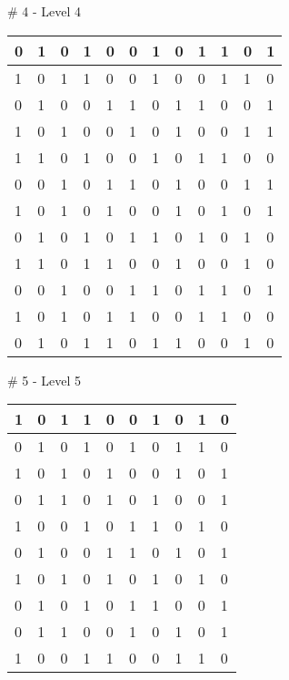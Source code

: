 \smallskip

\# 4 - Level 4 \newline
\begin{tabular}{|m{\collen}|m{\collen}|m{\collen}|m{\collen}|m{\collen}|m{\collen}|m{\collen}|m{\collen}|m{\collen}|m{\collen}|m{\collen}|m{\collen}|}
\hline
  0 & 1 & 0 & 1 & 0 & 0 & 1 & 0 & 1 & 1 & 0 & 1 \\
\hline
  1 & 0 & 1 & 1 & 0 & 0 & 1 & 0 & 0 & 1 & 1 & 0 \\
\hline
  0 & 1 & 0 & 0 & 1 & 1 & 0 & 1 & 1 & 0 & 0 & 1 \\
\hline
  1 & 0 & 1 & 0 & 0 & 1 & 0 & 1 & 0 & 0 & 1 & 1 \\
\hline
  1 & 1 & 0 & 1 & 0 & 0 & 1 & 0 & 1 & 1 & 0 & 0 \\
\hline
  0 & 0 & 1 & 0 & 1 & 1 & 0 & 1 & 0 & 0 & 1 & 1 \\
\hline
  1 & 0 & 1 & 0 & 1 & 0 & 0 & 1 & 0 & 1 & 0 & 1 \\
\hline
  0 & 1 & 0 & 1 & 0 & 1 & 1 & 0 & 1 & 0 & 1 & 0 \\
\hline
  1 & 1 & 0 & 1 & 1 & 0 & 0 & 1 & 0 & 0 & 1 & 0 \\
\hline
  0 & 0 & 1 & 0 & 0 & 1 & 1 & 0 & 1 & 1 & 0 & 1 \\
\hline
  1 & 0 & 1 & 0 & 1 & 1 & 0 & 0 & 1 & 1 & 0 & 0 \\
\hline
  0 & 1 & 0 & 1 & 1 & 0 & 1 & 1 & 0 & 0 & 1 & 0 \\
\hline
\end{tabular}


\smallskip

\# 5 - Level 5 \newline
\begin{tabular}{|m{\collen}|m{\collen}|m{\collen}|m{\collen}|m{\collen}|m{\collen}|m{\collen}|m{\collen}|m{\collen}|m{\collen}|}
\hline
  1 & 0 & 1 & 1 & 0 & 0 & 1 & 0 & 1 & 0 \\
\hline
  0 & 1 & 0 & 1 & 0 & 1 & 0 & 1 & 1 & 0 \\
\hline
  1 & 0 & 1 & 0 & 1 & 0 & 0 & 1 & 0 & 1 \\
\hline
  0 & 1 & 1 & 0 & 1 & 0 & 1 & 0 & 0 & 1 \\
\hline
  1 & 0 & 0 & 1 & 0 & 1 & 1 & 0 & 1 & 0 \\
\hline
  0 & 1 & 0 & 0 & 1 & 1 & 0 & 1 & 0 & 1 \\
\hline
  1 & 0 & 1 & 0 & 1 & 0 & 1 & 0 & 1 & 0 \\
\hline
  0 & 1 & 0 & 1 & 0 & 1 & 1 & 0 & 0 & 1 \\
\hline
  0 & 1 & 1 & 0 & 0 & 1 & 0 & 1 & 0 & 1 \\
\hline
  1 & 0 & 0 & 1 & 1 & 0 & 0 & 1 & 1 & 0 \\
\hline
\end{tabular}


